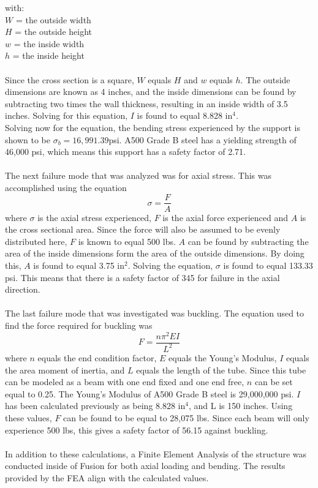 \documentclass[10pt]{project}
\begin{document}
\noindent with:\\
$W$ = the outside width\\
$H$ = the outside height\\
$w$ = the inside width\\
$h$ = the inside height\\\\
Since the cross section is a square, $W$ equals $H$ and $w$ equals $h$.  The outside dimensions are known as 4 inches, and the inside dimensions can be found by subtracting two times the wall thickness, resulting in an inside width of 3.5 inches.  Solving for this equation, $I$ is found to equal 8.828 in$^4$.\\
Solving now for the equation, the bending stress experienced by the support is shown to be $\sigma_b = 16,991.39$psi.  A500 Grade B steel has a yielding strength of 46,000 psi\cite{a500}, which means this support has a safety factor of 2.71.\\\\
The next failure mode that was analyzed was for axial stress.  This was accomplished using the equation $$\sigma = \frac{F}{A}$$
where $\sigma$ is the axial stress experienced, $F$ is the axial force experienced and $A$ is the cross sectional area.  Since the force will also be assumed to be evenly distributed here, $F$ is known to equal 500 lbs.  $A$ can be found by subtracting the area of the inside dimensions form the area of the outside dimensions.  By doing this, $A$ is found to equal 3.75 in$^2$.  Solving the equation, $\sigma$ is found to equal 133.33 psi.  This means that there is a safety factor of 345 for failure in the axial direction.\\\\
The last failure mode that was investigated was buckling.  The equation used to find the force required for buckling was $$F = \frac{n\pi ^2EI}{L^2}$$
where $n$ equals the end condition factor, $E$ equals the Young's Modulus, $I$ equals the area moment of inertia, and $L$ equals the length of the tube.  Since this tube can be modeled as a beam with one end fixed and one end free, $n$ can be set equal to 0.25\cite{buckling}.  The Young's Modulus of A500 Grade B steel is 29,000,000 psi\cite{a500}.  $I$ has been calculated previously as being 8.828 in$^4$, and L is 150 inches.  Using these values, $F$ can be found to be equal to 28,075 lbs.  Since each beam will only experience 500 lbs, this gives a safety factor of 56.15 against buckling.\\\\
In addition to these calculations, a Finite Element Analysis of the structure was conducted inside of Fusion for both axial loading and bending.  The results provided by the FEA align with the calculated values.\\\\
\end{document}
